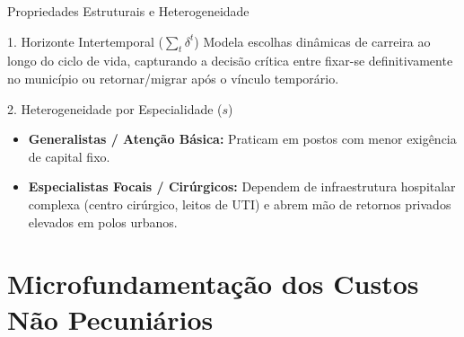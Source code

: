 \documentclass[aspectratio=169, 10pt]{beamer}
\begin{document}
\begin{frame}{Propriedades Estruturais e Heterogeneidade}
  \begin{block}{1. Horizonte Intertemporal ($\sum_t \delta^t$)}
    Modela escolhas dinâmicas de carreira ao longo do ciclo de vida, capturando a decisão crítica entre fixar-se definitivamente no município ou retornar/migrar após o vínculo temporário.
  \end{block}

  \vspace{0.2cm}
  \begin{block}{2. Heterogeneidade por Especialidade ($s$)}
    \begin{itemize}
      \item \textbf{Generalistas / Atenção Básica:} Praticam em postos com menor exigência de capital fixo.
      \item \textbf{Especialistas Focais / Cirúrgicos:} Dependem de infraestrutura hospitalar complexa (centro cirúrgico, leitos de UTI) e abrem mão de retornos privados elevados em polos urbanos.
    \end{itemize}
  \end{block}
\end{frame}

\section{Microfundamentação dos Custos Não Pecuniários}
\end{document}
